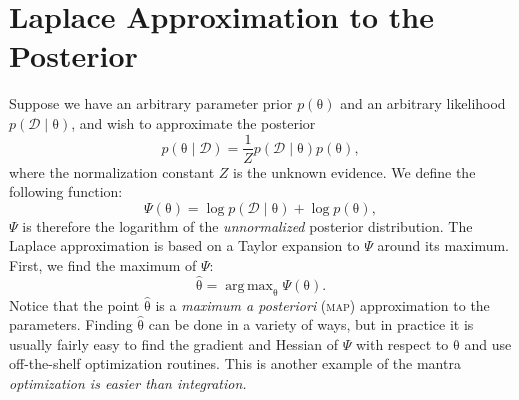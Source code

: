 \documentclass{article}
\newcommand{\acro}[1]{\textsc{\MakeLowercase{#1}}}
\newcommand{\given}{\mid}
\newcommand{\mc}[1]{\mathcal{#1}}
\newcommand{\data}{\mc{D}}
\renewcommand{\vec}[1]{\bm{\mathrm{#1}}}
\DeclareMathOperator*{\argmax}{arg\,max}
\begin{document}
\section*{Laplace Approximation to the Posterior}

Suppose we have an arbitrary parameter prior $p(\vec{\theta})$ and an
arbitrary likelihood $p(\data \given \vec{\theta})$, and wish to
approximate the posterior
\begin{equation*}
  p(\vec{\theta} \given \data)
  =
  \frac{1}{Z}
  p(\data \given \vec{\theta})
  p(\vec{\theta}),
\end{equation*}
where the normalization constant $Z$ is the unknown evidence.  We
define the following function:
\begin{equation*}
  \Psi(\vec{\theta})
  =
  \log p(\data \given \vec{\theta})
  +
  \log p(\vec{\theta}),
\end{equation*}
$\Psi$ is therefore the logarithm of the \emph{unnormalized} posterior
distribution.  The Laplace approximation is based on a Taylor
expansion to $\Psi$ around its maximum.  First, we find the maximum of
$\Psi$:
\begin{equation*}
  \hat{\vec{\theta}}
  =
  \argmax_{\vec{\theta}}
  \Psi(\vec{\theta}).
\end{equation*}
Notice that the point $\hat{\vec{\theta}}$ is a \emph{maximum a
  posteriori} (\acro{MAP}) approximation to the parameters.  Finding
$\hat{\vec{\theta}}$ can be done in a variety of ways, but in practice
it is usually fairly easy to find the gradient and Hessian of $\Psi$
with respect to $\vec{\theta}$ and use off-the-shelf optimization
routines.  This is another example of the mantra \emph{optimization is
  easier than integration.}
\end{document}
